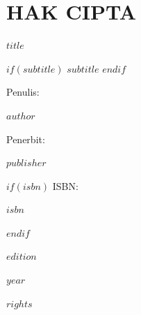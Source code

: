 \clearpage
\thispagestyle{empty}

\section*{HAK CIPTA}

\textbf{$title$}

$if(subtitle)$
$subtitle$
$endif$

\vspace{1cm}

Penulis:

$author$

\vspace{0.5cm}

Penerbit:

$publisher$

\vspace{0.5cm}

$if(isbn)$
ISBN:

$isbn$

\vspace{0.5cm}
$endif$

$edition$

$year$

\vfill

$rights$
